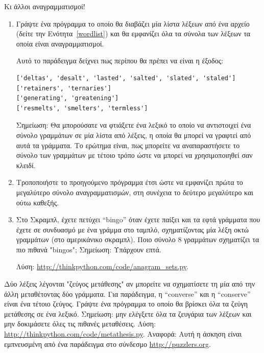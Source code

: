 \documentclass[10pt]{book}
\begin{document}
\begin{exercise}
\label{anagrams}

Κι άλλοι αναγραμματισμοί!

\begin{enumerate}

\item Γράψτε ένα πρόγραμμα το οποίο θα διαβάζει μία λίστα λέξεων από ένα αρχείο (δείτε την Ενότητα~\ref{wordlist}) και θα εμφανίζει όλα τα σύνολα των λέξεων τα οποία είναι αναγραμματισμοί.

Αυτό το παράδειγμα δείχνει πως περίπου θα πρέπει να είναι η έξοδος:

\begin{verbatim}
['deltas', 'desalt', 'lasted', 'salted', 'slated', 'staled']
['retainers', 'ternaries']
['generating', 'greatening']
['resmelts', 'smelters', 'termless']
\end{verbatim}
%
Σημείωση: Θα μπορούσατε να φτιάξετε ένα λεξικό το οποίο να αντιστοιχεί ένα σύνολο γραμμάτων σε μία λίστα από λέξεις, η οποία θα μπορεί να γραφτεί από αυτά τα γράμματα. Το ερώτημα είναι, πως μπορείτε να αναπαραστήσετε το σύνολο των γραμμάτων με τέτοιο τρόπο ώστε να μπορεί να χρησιμοποιηθεί σαν κλειδί.

\item Τροποποιήστε το προηγούμενο πρόγραμμα έτσι ώστε να εμφανίζει πρώτα το μεγαλύτερο σύνολο αναγραμματισμών, στη συνέχεια το δεύτερο μεγαλύτερο και ούτω καθεξής.

\item Στο Σκραμπλ, έχετε πετύχει ``bingo'' όταν έχετε παίξει και τα εφτά γράμματα που έχετε σε συνδυασμό με ένα γράμμα στο ταμπλό, σχηματίζοντας μία λέξη οκτώ γραμμάτων (στο αμερικάνικο σκραμπλ). Ποιο σύνολο 8 γραμμάτων σχηματίζει τα πιο πιθανά "bingos"; Σημείωση: Υπάρχουν επτά.


Λύση: \url{http://thinkpython.com/code/anagram_sets.py}.
\\
\end{enumerate}

\end{exercise}


\begin{exercise}

Δύο λέξεις λέγονται "ζεύγος μετάθεσης" αν μπορείτε να σχηματίσετε τη μία από την άλλη μεταθέτοντας δύο γράμματα. Για παράδειγμα, η ``converse''  και η  ``conserve'' είναι ένα τέτοιο ζεύγος. Γράψτε ένα πρόγραμμα το οποίο θα βρίσκει όλα τα ζεύγη μετάθεσης σε ένα λεξικό. Σημείωση: μην ελέγξετε όλα τα ζευγάρια των λέξεων και μην δοκιμάσετε όλες τις πιθανές μεταθέσεις. Λύση: \url{http://thinkpython.com/code/metathesis.py}. Αναφορά: Αυτή η άσκηση είναι εμπνευσμένη από ένα παράδειγμα στο σύνδεσμο \url{http://puzzlers.org}.
\\
\end{exercise}
\end{document}
